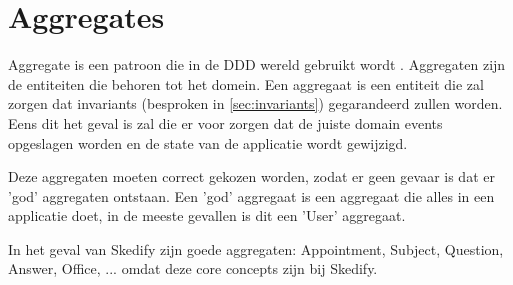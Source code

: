 
\section{Aggregates}
\label{sec:aggregates}

Aggregate is een patroon die in de \gls{DDD} wereld gebruikt wordt \textcite{FowlerAggregate}. Aggregaten zijn de entiteiten die behoren tot het domein. Een aggregaat is een entiteit die zal zorgen dat invariants (besproken in \ref{sec:invariants}) gegarandeerd zullen worden. Eens dit het geval is zal die er voor zorgen dat de juiste domain events opgeslagen worden en de state van de applicatie wordt gewijzigd.

Deze aggregaten moeten correct gekozen worden, zodat er geen gevaar is dat er 'god' aggregaten ontstaan. Een 'god' aggregaat is een aggregaat die alles in een applicatie doet, in de meeste gevallen is dit een 'User' aggregaat.

In het geval van Skedify zijn goede aggregaten: Appointment, Subject, Question, Answer, Office, ... omdat deze core concepts zijn bij Skedify.